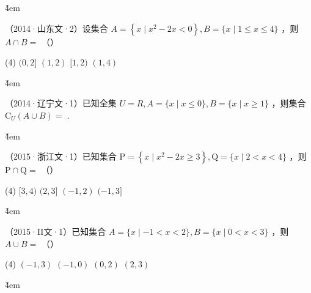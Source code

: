 \v{4em}

\begin{example}
    （2014·山东文·2）设集合 $A=\left\{x \mid x^2-2 x<0\right\}, B=\{x \mid 1 \leq x \leq 4\}$ ，则 $A \cap B=$ （\qquad）
    \begin{tasks}(4)
        \task $(0,2]$
        \task $(1,2)$
        \task $[1,2)$
        \task $(1,4)$
    \end{tasks}
\end{example}

\v{4em}

\begin{example}
    （2014·辽宁文·1）已知全集 $U=R, A=\{x \mid x \leq 0\}, B=\{x \mid x \geq 1\}$ ，则集合 $\mathrm{C}_U(A \cup B)=$ \underline{\qquad}.
\end{example}

\v{4em}

\begin{example}
    （2015·浙江文·1）已知集合 $\mathrm{P}=\left\{x \mid x^2-2 x \geq 3\right\}, \mathrm{Q}=\{x \mid 2<x<4\}$ ，则 $\mathrm{P} \cap \mathrm{Q}=$ （\qquad）
    \begin{tasks}(4)
        \task $[3,4)$
                        \task $(2,3]$
        \task $(-1,2)$
        \task $(-1,3]$
    \end{tasks}
\end{example}

\v{4em}

\begin{example}
    （2015·II文·1）已知集合 $A=\{x \mid-1<x<2\}, B=\{x \mid 0<x<3\}$ ，则 $A \cup B=$ （\qquad）
    \begin{tasks}(4)
        \task $(-1,3)$
        \task $(-1,0)$
        \task $(0,2)$
        \task $(2,3)$
    \end{tasks}
\end{example}

\v{4em}

